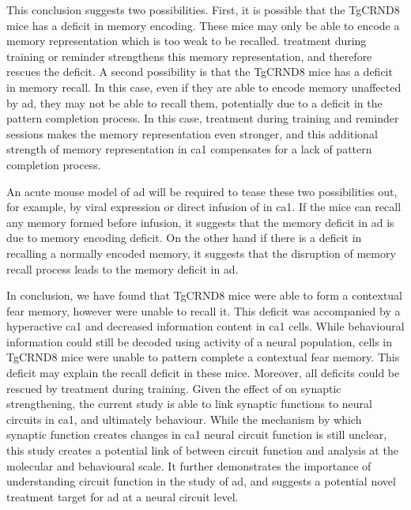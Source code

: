 This conclusion suggests two possibilities. First, it is possible that the TgCRND8 mice has a deficit in memory encoding. These mice may only be able to encode a memory representation which is too weak to be recalled. \tglu{} treatment during training or reminder strengthens this memory representation, and therefore rescues the deficit. A second possibility is that the TgCRND8 mice has a deficit in memory recall. In this case, even if they are able to encode memory unaffected by \gls{ad}, they may not be able to recall them, potentially due to a deficit in the pattern completion process. In this case, \tglu{} treatment during training and reminder sessions makes the memory representation even stronger, and this additional strength of memory representation in \gls{ca1} compensates for a lack of pattern completion process. 

An acute mouse model of \gls{ad} will be required to tease these two possibilities out, for example, by viral expression or direct infusion of \abeta{} in \gls{ca1}. If the mice can recall any memory formed before \abeta{} infusion, it suggests that the memory deficit in \gls{ad} is due to memory encoding deficit. On the other hand if there is a deficit in recalling a normally encoded memory, it suggests that the disruption of memory recall process leads to the memory deficit in \gls{ad}.

In conclusion, we have found that TgCRND8 mice were able to form a contextual fear memory, however were unable to recall it. This deficit was accompanied by a hyperactive \gls{ca1} and decreased information content in \gls{ca1} cells. While behavioural information could still be decoded using activity of a neural population, cells in TgCRND8 mice were unable to pattern complete a contextual fear memory. This deficit may explain the recall deficit in these mice. Moreover, all deficits could be rescued by \tglu{} treatment during training. Given the effect of \tglu{} on synaptic strengthening, the current study is able to link synaptic functions to neural circuits in \gls{ca1}, and ultimately behaviour. While the mechanism by which synaptic function creates changes in \gls{ca1} neural circuit function is still unclear, this study creates a potential link of between circuit function and analysis at the molecular and behavioural scale. It further demonstrates the importance of understanding circuit function in the study of \gls{ad}, and suggests a potential novel treatment target for \gls{ad} at a neural circuit level. 

